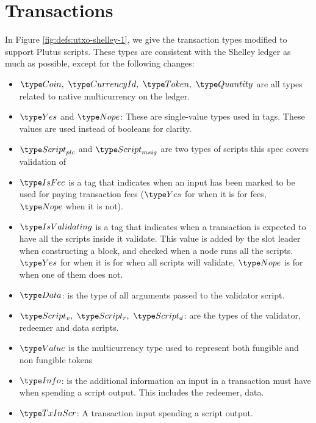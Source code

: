 \section{Transactions}
\label{sec:transactions}

In Figure \ref{fig:defs:utxo-shelley-1}, we give the transaction types modified
to support Plutus scripts. These types are consistent with the Shelley ledger
as much as possible,
except for the following changes:

\begin{itemize}
  \item $\Coin,~\CurrencyId,~\Token,~\Quantity$ are all types
  related to native multicurrency on the ledger.

  \item $\Yes$ and $\Nope$: These are single-value types used in tags. These
  values are used instead of booleans for clarity.

  \item $\ScriptPlutus$ and $\ScriptMSig$ are two types of scripts this spec
  covers validation of

  \item $\IsFee$ is a tag that indicates when an input has been marked
  to be used for paying transaction fees ($\Yes$ for when it is for fees,
  $\Nope$ when it is not).

  \item $\IsValidating$ is a tag that indicates when a transaction is
  expected to have all the scripts inside it validate.
  This value is added by the slot leader when
  constructing a block, and checked when a node runs all the scripts.
  $\Yes$ for when it is for when all scripts will validate,
  $\Nope$ is for when one of them does not.

  \item $\Data$: is the type of all arguments passed to the validator script.

  \item $\ScriptV,~ \ScriptR,~ \ScriptD$: are the types of the validator,
  redeemer and data scripts.

  \item $\Value$ is the multicurrency type used to represent
  both fungible and non fungible tokens

  \item $\Info$: is the additional information an input in a transaction must
  have when spending a script output. This includes the redeemer,
  data.

  \item $\TxInScr$: A transaction input spending a script output.


\end{itemize}
